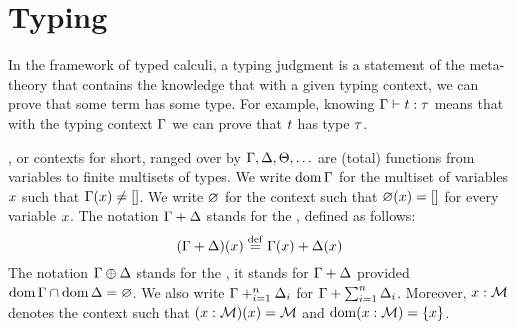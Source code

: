 \section{Typing}

In the framework of typed calculi, a typing judgment is a statement of the meta-theory that
contains the knowledge that
with a given typing context, we can prove that some term has some type.
For example, knowing $\Gamma \vdash t : \tau$ means that
with the typing context $\Gamma$ we can prove that $t$ has type $\tau$.

, or contexts for short,
ranged over by $\Gamma,\Delta,\Theta,\hdots$ are (total) functions from variables to finite multisets of types.
We write $\operatorname{dom}\Gamma$ for the multiset of variables $x$ such that $\Gamma(x) \neq []$.
We write $\varnothing$ for the context such that $\varnothing(x) = []$ for every variable $x$.
The notation $\Gamma + \Delta$ stands for the , defined as follows:
\[
    (\Gamma + \Delta)(x) \overset{\mathrm{def}}{=} \Gamma(x) + \Delta(x)
\]
The notation $\Gamma \oplus \Delta$ stands for the ,
\ie it stands for $\Gamma + \Delta$ provided $\operatorname{dom}\Gamma \cap \operatorname{dom}\Delta = \varnothing$.
We also write $\Gamma +_{i=1}^{n} \Delta_i$ for $\Gamma + \sum_{i=1}^{n} \Delta_i$.
Moreover, $x : \mathcal{M}$ denotes the context such that $(x : \mathcal{M})(x) = \mathcal{M}$
and $\operatorname{dom}(x : \mathcal{M}) = \{x\}$.

